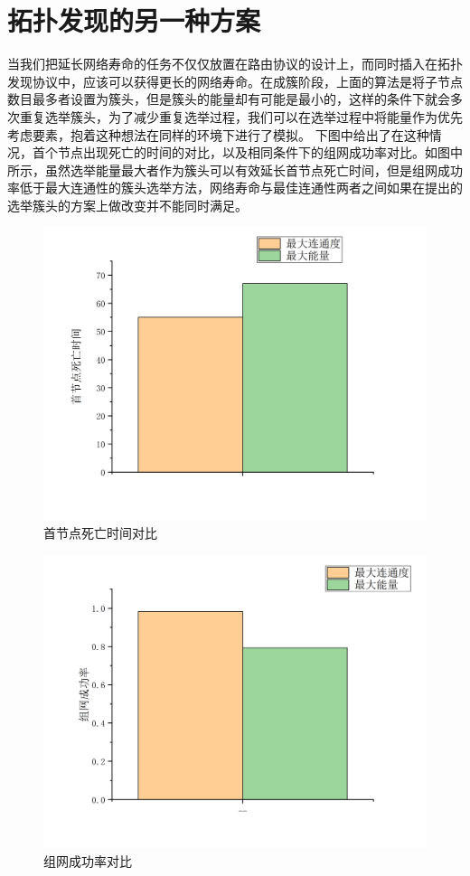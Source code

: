\documentclass[a4paper,AutoFakeBold,oneside,12pt]{book}
\begin{document}
  \section{拓扑发现的另一种方案}
  当我们把延长网络寿命的任务不仅仅放置在路由协议的设计上，而同时插入在拓扑发现协议中，应该可以获得更长的网络寿命。在成簇阶段，上面的算法是将子节点数目最多者设置为簇头，但是簇头的能量却有可能是最小的，这样的条件下就会多次重复选举簇头，为了减少重复选举过程，我们可以在选举过程中将能量作为优先考虑要素，抱着这种想法在同样的环境下进行了模拟。
  下图中给出了在这种情况，首个节点出现死亡的时间的对比，以及相同条件下的组网成功率对比。如图中所示，虽然选举能量最大者作为簇头可以有效延长首节点死亡时间，但是组网成功率低于最大连通性的簇头选举方法，网络寿命与最佳连通性两者之间如果在提出的选举簇头的方案上做改变并不能同时满足。
   \begin{figure}[htbp]
\centering %
\includegraphics[scale=0.3]{pictures/siwang-routing.png} 
\caption{首节点死亡时间对比 } %
\label{siwang-routing}
\end{figure}
 \begin{figure}[htbp]
\centering %
\includegraphics[scale=0.3]{pictures/routing-success.png} 
\caption{组网成功率对比 } %
\label{routing-success}
\end{figure}
\end{document}
